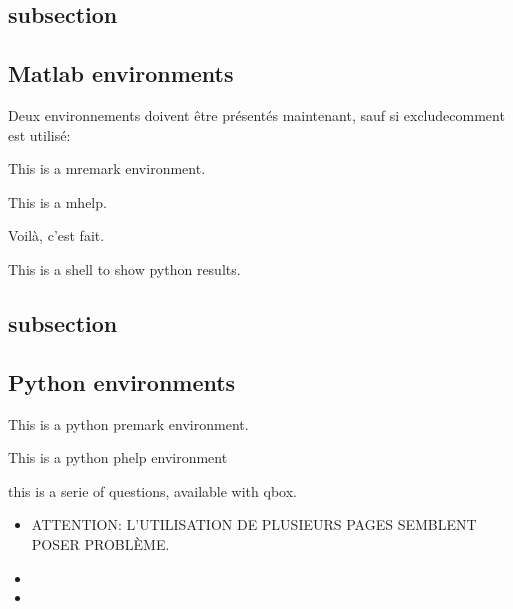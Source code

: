 \documentclass[11pt,table]{book}
\begin{document}
\subsection{subsection}
\subsection{Matlab environments}
Deux environnements doivent être présentés maintenant, sauf si excludecomment est utilisé:

\begin{mcomment}

\begin{mremark}
This is a \matlabregistered{} mremark environment.
\end{mremark}

\end{mcomment}

\begin{mhelp}
This is a \matlabregistered{} mhelp. 

\lipsum[1-2]
\end{mhelp}


Voilà, c'est fait.

\begin{sh}
This is a shell to show python results.
\end{sh}
 
\subsection{subsection}
\subsection{Python environments}

\begin{pcomment}

\begin{premark}
This is a python premark environment.
\end{premark}

\end{pcomment}


\begin{phelp}
 This is a python phelp environment
\end{phelp}

\begin{qbox}
 this is a serie of questions, available with qbox.
\begin{itemize}
\item ATTENTION: L'UTILISATION DE PLUSIEURS PAGES SEMBLENT POSER PRO\-BLÈME.
 \item \lipsum[1]
 \item \lipsum[1-2]
\end{itemize}
\end{qbox}
\end{document}
